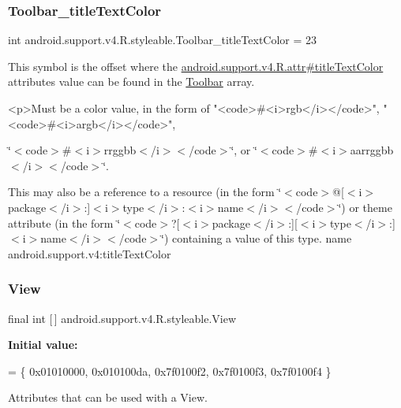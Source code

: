 \subsubsection{\texorpdfstring{Toolbar\+\_\+title\+Text\+Color}{Toolbar\_titleTextColor}}
{\footnotesize\ttfamily int android.\+support.\+v4.\+R.\+styleable.\+Toolbar\+\_\+title\+Text\+Color = 23\hspace{0.3cm}{\ttfamily [static]}}

This symbol is the offset where the \hyperlink{classandroid_1_1support_1_1v4_1_1R_1_1attr_a82b688a0bd0ebfb31f60e9f59a5191fe}{android.\+support.\+v4.\+R.\+attr\#title\+Text\+Color} attribute\textquotesingle{}s value can be found in the \hyperlink{classandroid_1_1support_1_1v4_1_1R_1_1styleable_a211358a2f951023c7735caea0fb5ae04}{Toolbar} array.

\begin{DoxyVerb}      <p>Must be a color value, in the form of "<code>#<i>rgb</i></code>", "<code>#<i>argb</i></code>",
\end{DoxyVerb}
 \char`\"{}$<$code$>$\#$<$i$>$rrggbb$<$/i$>$$<$/code$>$\char`\"{}, or \char`\"{}$<$code$>$\#$<$i$>$aarrggbb$<$/i$>$$<$/code$>$\char`\"{}. 

This may also be a reference to a resource (in the form \char`\"{}$<$code$>$@\mbox{[}$<$i$>$package$<$/i$>$\+:\mbox{]}$<$i$>$type$<$/i$>$\+:$<$i$>$name$<$/i$>$$<$/code$>$\char`\"{}) or theme attribute (in the form \char`\"{}$<$code$>$?\mbox{[}$<$i$>$package$<$/i$>$\+:\mbox{]}\mbox{[}$<$i$>$type$<$/i$>$\+:\mbox{]}$<$i$>$name$<$/i$>$$<$/code$>$\char`\"{}) containing a value of this type.  name android.\+support.\+v4\+:title\+Text\+Color \mbox{\label{classandroid_1_1support_1_1v4_1_1R_1_1styleable_a165672be2496e8f1adf1b075bb5fe74f}} 
\subsubsection{\texorpdfstring{View}{View}}
{\footnotesize\ttfamily final int \mbox{[}$\,$\mbox{]} android.\+support.\+v4.\+R.\+styleable.\+View\hspace{0.3cm}{\ttfamily [static]}}

{\bfseries Initial value\+:}
\begin{DoxyCode}
= \{
            0x01010000, 0x010100da, 0x7f0100f2, 0x7f0100f3,
            0x7f0100f4
        \}
\end{DoxyCode}
Attributes that can be used with a View. 

